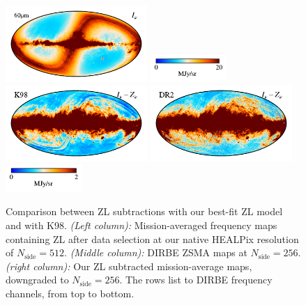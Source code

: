 \documentclass[twocolumn]{aa}
\begin{document}
\begin{figure}
    \includegraphics[height=2.90cm]{figs/compare_zsma/cosmoglobe_ma_07.pdf}%
    \includegraphics[width=2.90cm,angle=90]{figs/compare_zsma/cbar_tot_07.pdf}%
    \includegraphics[height=2.90cm]{figs/compare_zsma/dirbe_zsma_07.pdf}%
    \includegraphics[height=2.90cm]{figs/compare_zsma/cosmoglobe_zsma_07.pdf}%
    \includegraphics[width=2.90cm,angle=90]{figs/compare_zsma/cbar_07.pdf}%
      \\
    \caption{Comparison between ZL subtractions with our best-fit ZL model and with K98. 
    \textit{(Left column):} Mission-averaged frequency maps containing ZL after data selection at our native HEALPix resolution 
    of $N_\mathrm{side} = 512$. \textit{(Middle column):} DIRBE ZSMA maps
    at $N_\mathrm{side} = 256$.\textit{(right column):} Our ZL subtracted mission-average 
    maps, downgraded to $N_\mathrm{side} = 256$. The rows list to DIRBE frequency channels, from top to 
    bottom. 
    }
    \label{fig:dr2-zsma-compare1}
\end{figure}
\end{document}
